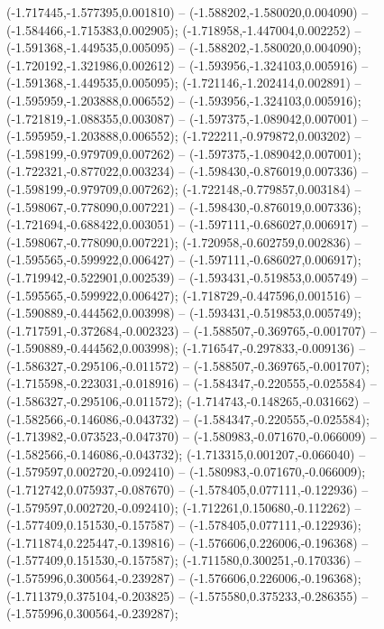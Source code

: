  (-1.717445,-1.577395,0.001810) -- (-1.588202,-1.580020,0.004090) -- (-1.584466,-1.715383,0.002905);
 (-1.718958,-1.447004,0.002252) -- (-1.591368,-1.449535,0.005095) -- (-1.588202,-1.580020,0.004090);
 (-1.720192,-1.321986,0.002612) -- (-1.593956,-1.324103,0.005916) -- (-1.591368,-1.449535,0.005095);
 (-1.721146,-1.202414,0.002891) -- (-1.595959,-1.203888,0.006552) -- (-1.593956,-1.324103,0.005916);
 (-1.721819,-1.088355,0.003087) -- (-1.597375,-1.089042,0.007001) -- (-1.595959,-1.203888,0.006552);
 (-1.722211,-0.979872,0.003202) -- (-1.598199,-0.979709,0.007262) -- (-1.597375,-1.089042,0.007001);
 (-1.722321,-0.877022,0.003234) -- (-1.598430,-0.876019,0.007336) -- (-1.598199,-0.979709,0.007262);
 (-1.722148,-0.779857,0.003184) -- (-1.598067,-0.778090,0.007221) -- (-1.598430,-0.876019,0.007336);
 (-1.721694,-0.688422,0.003051) -- (-1.597111,-0.686027,0.006917) -- (-1.598067,-0.778090,0.007221);
 (-1.720958,-0.602759,0.002836) -- (-1.595565,-0.599922,0.006427) -- (-1.597111,-0.686027,0.006917);
 (-1.719942,-0.522901,0.002539) -- (-1.593431,-0.519853,0.005749) -- (-1.595565,-0.599922,0.006427);
 (-1.718729,-0.447596,0.001516) -- (-1.590889,-0.444562,0.003998) -- (-1.593431,-0.519853,0.005749);
 (-1.717591,-0.372684,-0.002323) -- (-1.588507,-0.369765,-0.001707) -- (-1.590889,-0.444562,0.003998);
 (-1.716547,-0.297833,-0.009136) -- (-1.586327,-0.295106,-0.011572) -- (-1.588507,-0.369765,-0.001707);
 (-1.715598,-0.223031,-0.018916) -- (-1.584347,-0.220555,-0.025584) -- (-1.586327,-0.295106,-0.011572);
 (-1.714743,-0.148265,-0.031662) -- (-1.582566,-0.146086,-0.043732) -- (-1.584347,-0.220555,-0.025584);
 (-1.713982,-0.073523,-0.047370) -- (-1.580983,-0.071670,-0.066009) -- (-1.582566,-0.146086,-0.043732);
 (-1.713315,0.001207,-0.066040) -- (-1.579597,0.002720,-0.092410) -- (-1.580983,-0.071670,-0.066009);
 (-1.712742,0.075937,-0.087670) -- (-1.578405,0.077111,-0.122936) -- (-1.579597,0.002720,-0.092410);
 (-1.712261,0.150680,-0.112262) -- (-1.577409,0.151530,-0.157587) -- (-1.578405,0.077111,-0.122936);
 (-1.711874,0.225447,-0.139816) -- (-1.576606,0.226006,-0.196368) -- (-1.577409,0.151530,-0.157587);
 (-1.711580,0.300251,-0.170336) -- (-1.575996,0.300564,-0.239287) -- (-1.576606,0.226006,-0.196368);
 (-1.711379,0.375104,-0.203825) -- (-1.575580,0.375233,-0.286355) -- (-1.575996,0.300564,-0.239287);
